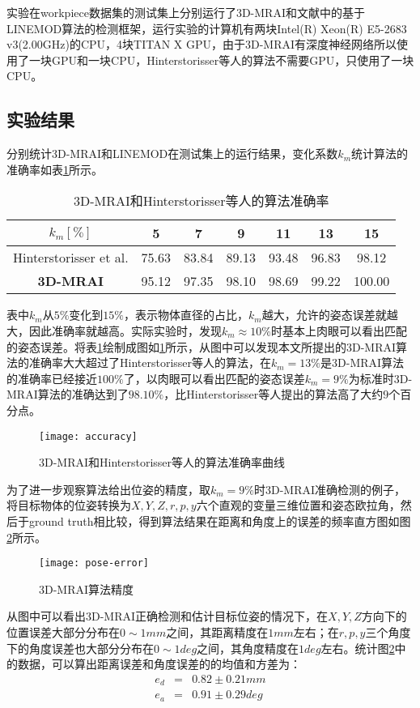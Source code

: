 实验在workpiece数据集的测试集上分别运行了3D-MRAI和文献\cite{hinterstoisser2012model}中的基于LINEMOD算法的检测框架，运行实验的计算机有两块Intel(R) Xeon(R) E5-2683 v3(2.00GHz)的CPU，4块TITAN X GPU，由于3D-MRAI有深度神经网络所以使用了一块GPU和一块CPU，Hinterstorisser等人的算法不需要GPU，只使用了一块CPU。

\subsection{实验结果}
分别统计3D-MRAI和LINEMOD在测试集上的运行结果，变化系数$k_m$统计算法的准确率如表\ref{tab:mrai}所示。
\begin{table}[ht]
  \centering
  \begin{tabular}{ccccccc}
    \toprule
    $k_m[\%]$&5&7&9&11&13&15\\
    \midrule
    Hinterstorisser et al.&75.63& 83.84& 89.13& 93.48& 96.83&98.12\\
    \bf{3D-MRAI}&95.12& 97.35& 98.10& 98.69& 99.22& 100.00\\
    \bottomrule
  \end{tabular}
  \caption{3D-MRAI和Hinterstorisser等人的算法准确率}
  \label{tab:mrai}
\end{table}
表中$k_m$从$5\%$变化到$15\%$，表示物体直径的占比，$k_m$越大，允许的姿态误差就越大，因此准确率就越高。实际实验时，发现$k_m\approx 10\%$时基本上肉眼可以看出匹配的姿态误差。将表\ref{tab:mrai}绘制成图如\ref{fig:mrai}所示，从图中可以发现本文所提出的3D-MRAI算法的准确率大大超过了Hinterstorisser等人的算法，在$k_m=13\%$是3D-MRAI算法的准确率已经接近$100\%$了，以肉眼可以看出匹配的姿态误差$k_m=9\%$为标准时3D-MRAI算法的准确达到了$98.10\%$，比Hinterstorisser等人提出的算法高了大约$9$个百分点。
\begin{figure}[ht]
  \centering
  \texttt{[image: accuracy]}
  \caption{3D-MRAI和Hinterstorisser等人的算法准确率曲线}
  \label{fig:mrai}
\end{figure}

为了进一步观察算法给出位姿的精度，取$k_m=9\%$时3D-MRAI准确检测的例子，将目标物体的位姿转换为$X,Y,Z,r,p,y$六个直观的变量三维位置和姿态欧拉角，然后于ground truth相比较，得到算法结果在距离和角度上的误差的频率直方图如图\ref{fig:pose-error}所示。
\begin{figure}[ht]
  \centering
  \texttt{[image: pose-error]}
  \caption{3D-MRAI算法精度}
  \label{fig:pose-error}
\end{figure}
从图中可以看出3D-MRAI正确检测和估计目标位姿的情况下，在$X,Y,Z$方向下的位置误差大部分分布在$0\sim 1mm$之间，其距离精度在$1mm$左右；在$r,p,y$三个角度下的角度误差也大部分分布在$0\sim 1deg$之间，其角度精度在$1deg$左右。统计图\ref{fig:pose-error}中的数据，可以算出距离误差和角度误差的的均值和方差为：
\begin{equation}
  \begin{array}{ccc}
    e_d &=& 0.82\pm0.21mm\\
    e_a &=& 0.91\pm0.29deg
  \end{array}
\end{equation}

